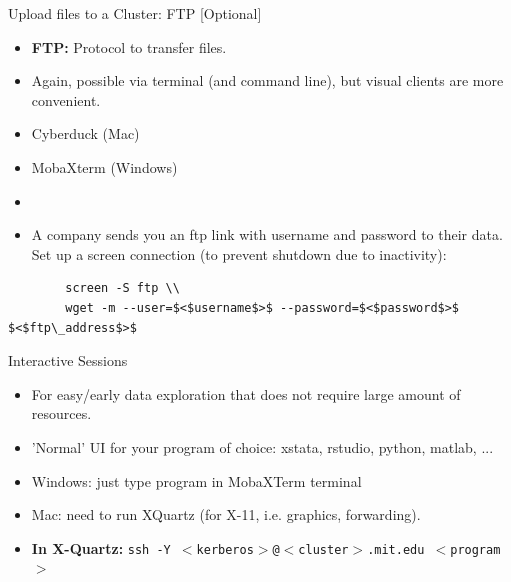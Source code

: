 \documentclass{beamer}
\begin{document}
\begin{frame}{Upload files to a Cluster: FTP [Optional]}
    \begin{itemize}
        \item \textbf{FTP:} Protocol to transfer files. 
        \item Again, possible via terminal (and command line), but visual clients are more convenient.
        \item Cyberduck (Mac)
        \item MobaXterm (Windows)
        \item[]
        \item A company sends you an ftp link with username and password to their data. Set up a screen connection (to prevent shutdown due to inactivity):
    \end{itemize}
    \begin{verbatim}
        screen -S ftp \\
        wget -m --user=$<$username$>$ --password=$<$password$>$ $<$ftp\_address$>$
    \end{verbatim}
\end{frame}

\begin{frame}{Interactive Sessions}
    \begin{itemize}
        \item For easy/early data exploration that does not require large amount of resources.
        \item 'Normal' UI for your program of choice: xstata, rstudio, python, matlab, ...
        \item Windows: just type program in MobaXTerm terminal
        \item Mac: need to run XQuartz (for X-11, i.e. graphics, forwarding).
        \item \textbf{In X-Quartz:} \texttt{ssh -Y $<$kerberos$>$@$<$cluster$>$.mit.edu $<$program$>$}
    \end{itemize}
\end{frame}
\end{document}
